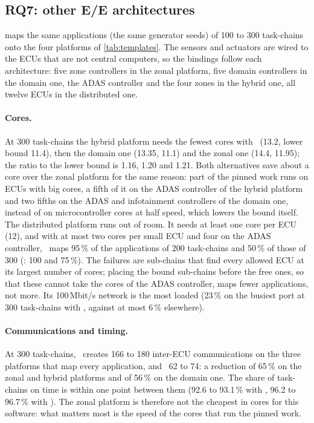 \subsection{RQ7: other E/E architectures}
\label{sec:rq7}

 maps the same applications (the same generator seeds) of
100 to 300 task-chains onto the four platforms of \cref{tab:templates}.
The sensors and actuators are wired to the ECUs that are not central
computers, so the bindings follow each architecture: five zone
controllers in the zonal platform, five domain controllers in the domain
one, the ADAS controller and the four zones in the hybrid one, all twelve
ECUs in the distributed one.

\paragraph{Cores.} At 300 task-chains the hybrid platform needs the
fewest cores with \FFDU\ (13.2, lower bound 11.4), then the domain one
(13.35, 11.1) and the zonal one (14.4, 11.95); the ratio to the lower
bound is 1.16, 1.20 and 1.21. Both alternatives save about a core over
the zonal platform for the same reason: part of the pinned work runs on
ECUs with big cores, a fifth of it on the ADAS controller of the hybrid
platform and two fifths on the ADAS and infotainment controllers of the
domain one, instead of on microcontroller cores at half speed, which
lowers the bound itself. The distributed platform runs out of room. It needs at least one
core per ECU (12), and with at most two cores per small ECU and four on
the ADAS controller, \FFDU\ maps 95\,\% of the applications of 200
task-chains and 50\,\% of those of 300 (\CADU: 100 and 75\,\%). The
failures are sub-chains that find every allowed ECU at its largest number
of cores; placing the bound sub-chains before the free ones, so that
these cannot take the cores of the ADAS controller, maps fewer
applications, not more. Its 100\,Mbit/s network is the most loaded
(23\,\% on the busiest port at 300 task-chains with \FFDU, against at
most 6\,\% elsewhere).

\paragraph{Communications and timing.} At 300 task-chains, \FFDU\ creates
166 to 180 inter-ECU communications on the three platforms that map every
application, and \CADU\ 62 to 74: a reduction of 65\,\% on the zonal
and hybrid platforms and of 56\,\% on the domain one. The
share of task-chains on time is within one point between them (92.6 to
93.1\,\% with \FFDU, 96.2 to 96.7\,\% with \CADU). The zonal platform is
therefore not the cheapest in cores for this software: what matters most
is the speed of the cores that run the pinned work.


